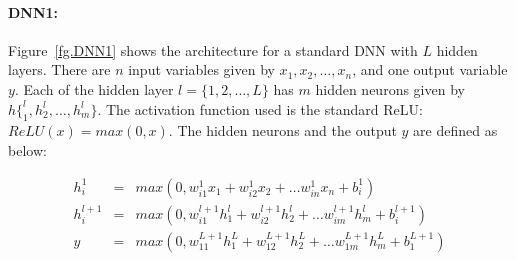 \documentclass[runningheads,a4paper]{llncs}
\begin{document}
\begin{figure*}[!htbp]
\begin{center}
\end{center}
\caption{We show a standard network {\sc DNN1} with $n$ input variables, $L$ hidden layers, and one output variable.}
\label{fg.DNN1}
\end{figure*}

\paragraph{{\sc DNN1:}} Figure~\ref{fg.DNN1} shows the architecture for a standard DNN with $L$ hidden layers. There are $n$ input variables given by $x_1,x_2,\dots,x_n$, and one output variable $y$. Each of the hidden layer $l=\{1,2,\dots,L\}$ has $m$ hidden neurons given by $h\{_1^l,h_2^l,\dots,h_m^l\}$. The activation function used is the standard ReLU: $ReLU(x) = max(0,x)$. The hidden neurons and the output $y$ are defined as below:

\begin{eqnarray*}
h_i^{1} & = &  max(0,w^1_{i1} x_1 + w^1_{i2} x_2 + \dots w^1_{in} x_n + b^1_i) \\ 
h_i^{l+1} & = & max(0,w^{l+1}_{i1} h^{l}_1 + w^{l+1}_{i2} h^{l}_2 + \dots w^{l+1}_{im} h^{l}_m + b^{l+1}_i) \\
y & = & max(0,w^{L+1}_{11} h^{L}_1 + w^{L+1}_{12} h^{L}_2 + \dots w^{L+1}_{1m} h^{L}_m + b^{L+1}_1) 
\end{eqnarray*}

\begin{figure*}[!htbp]
\begin{center}
\mbox{
}
\end{center}
\caption{(a) We show a simple network with 3 hidden layers having two neurons each. (b) Given an input $\vec{x}$ we show the outputs from each hidden layer in the form of a decision tree. The leaves in the decision tree correspond to all possible outputs $y$ that can be obtained from the network shown in (a).}
\label{fg.3_layer_eg}
\end{figure*}


\begin{figure*}[!htbp]
\begin{center}
\end{center}
\caption{{\sc DNN2} of Figure~\ref{fg.3_layer_eg}(a):}
\label{fg.3_layer_eg_DNN2}
\end{figure*}
\end{document}
